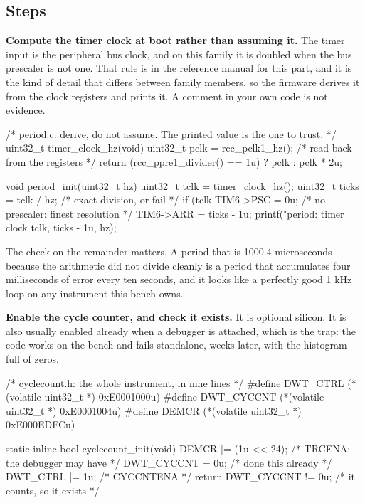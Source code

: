 \subsection*{Steps}

\begin{steps}
\item \textbf{Compute the timer clock at boot rather than assuming it.} The
timer input is the peripheral bus clock, and on this family it is doubled when
the bus prescaler is not one. That rule is in the reference manual for this
part, and it is the kind of detail that differs between family members, so the
firmware derives it from the clock registers and prints it. A comment in your
own code is not evidence.
\begin{ccode}
/* period.c: derive, do not assume. The printed value is the one to trust. */
uint32_t timer_clock_hz(void)
{
    uint32_t pclk = rcc_pclk1_hz();          /* read back from the registers */
    return (rcc_ppre1_divider() == 1u) ? pclk : pclk * 2u;
}

void period_init(uint32_t hz)
{
    uint32_t tclk = timer_clock_hz();
    uint32_t ticks = tclk / hz;              /* exact division, or fail */
    if (tclk %
    TIM6->PSC = 0u;                          /* no prescaler: finest resolution */
    TIM6->ARR = ticks - 1u;
    printf("period: timer clock %
           tclk, ticks - 1u, hz);
}
\end{ccode}
The check on the remainder matters. A period that is 1000.4 microseconds because
the arithmetic did not divide cleanly is a period that accumulates four
milliseconds of error every ten seconds, and it looks like a perfectly good
1 kHz loop on any instrument this bench owns.

\item \textbf{Enable the cycle counter, and check it exists.} It is optional
silicon. It is also usually enabled already when a debugger is attached, which
is the trap: the code works on the bench and fails standalone, weeks later,
with the histogram full of zeros.
\begin{ccode}
/* cyclecount.h: the whole instrument, in nine lines */
#define DWT_CTRL    (*(volatile uint32_t *) 0xE0001000u)
#define DWT_CYCCNT  (*(volatile uint32_t *) 0xE0001004u)
#define DEMCR       (*(volatile uint32_t *) 0xE000EDFCu)

static inline bool cyclecount_init(void)
{
    DEMCR |= (1u << 24);                     /* TRCENA: the debugger may have */
    DWT_CYCCNT = 0u;                         /* done this already             */
    DWT_CTRL |= 1u;                          /* CYCCNTENA                     */
    return DWT_CYCCNT != 0u;                 /* it counts, so it exists       */
}


\end{ccode}
\end{steps}
